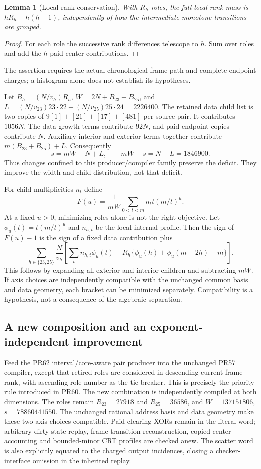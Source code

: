 \documentclass[11pt]{article}
\newtheorem{lemma}[theorem]{Lemma}
\begin{document}
\begin{lemma}[Local rank conservation]
With $R_h$ roles, the full local rank mass is
$hR_h+h(h-1)$, independently of how the intermediate monotone transitions
are grouped.
\end{lemma}
\begin{proof}
For each role the successive rank differences telescope to $h$.
Sum over roles and add the $h$ paid center contributions.
\end{proof}
The assertion requires the actual chronological frame path and complete
endpoint charges; a histogram alone does not establish its hypotheses.

Let $B_h=(N/v_h)R_h$, $W=2N+B_{23}+B_{25}$, and
$L=(N/v_{23})23\cdot22+(N/v_{25})25\cdot24=2226400$.
The retained data child list is two copies of
$9[1]+[21]+[17]+[481]$ per source pair. It contributes $1056N$.
The data-growth terms contribute $92N$, and paid endpoint copies contribute
$N$. Auxiliary interior and exterior terms together contribute
$m(B_{23}+B_{25})+L$. Consequently
\begin{equation}\label{eq:mass}
 s=mW-N+L,\qquad mW-s=N-L=1846900.
\end{equation}
Thus changes confined to this producer/compiler family preserve the deficit.
They improve the width and child distribution, not that deficit.

For child multiplicities $n_t$ define
\[
 F(u)=\frac{1}{mW}\sum_{0<t<m} n_t t (m/t)^u.
\]
At a fixed $u>0$, minimizing roles alone is not the right objective.
Let $\phi_u(t)=t(m/t)^u$ and $n_{h,t}$ be the local internal profile.
Then the sign of $F(u)-1$ is the sign of a fixed data contribution plus
\begin{equation}\label{eq:separable}
 \sum_{h\in\{23,25\}}\frac{N}{v_h}
 \left[\sum_t n_{h,t}\phi_u(t)
 +R_h\{\phi_u(h)+\phi_u(m-2h)-m\}\right].
\end{equation}
This follows by expanding all exterior and interior children and subtracting
$mW$. If axis choices are independently compatible with the unchanged common
basis and data geometry, each bracket can be minimized separately. Compatibility
is a hypothesis, not a consequence of the algebraic separation.

\subsection{A new composition and an exponent-independent improvement}
Feed the PR62 interval/core-aware pair producer into the unchanged PR57
compiler, except that retired roles are considered in descending current
frame rank, with ascending role number as the tie breaker. This is precisely
the priority rule introduced in PR60. The new combination is independently
compiled at both dimensions. The roles remain $R_{23}=27918$ and
$R_{25}=36586$, and
$W=137151806$, $s=78860441550$. The unchanged rational address basis and
data geometry make these two axis choices compatible. Paid clearing XORs
remain in the literal word; arbitrary dirty-state replay, frame-transition
reconstruction, copied-center accounting and bounded-minor CRT profiles are
checked anew. The scatter word is also explicitly equated to the charged
output incidences, closing a checker-interface omission in the inherited replay.
\end{document}
